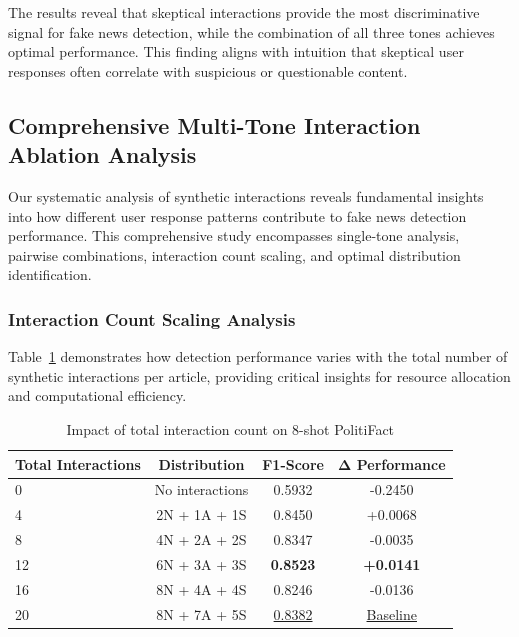 The results reveal that skeptical interactions provide the most discriminative signal for fake news detection, while the combination of all three tones achieves optimal performance. This finding aligns with intuition that skeptical user responses often correlate with suspicious or questionable content.

\subsection{Comprehensive Multi-Tone Interaction Ablation Analysis}

Our systematic analysis of synthetic interactions reveals fundamental insights into how different user response patterns contribute to fake news detection performance. This comprehensive study encompasses single-tone analysis, pairwise combinations, interaction count scaling, and optimal distribution identification.

\subsubsection{Interaction Count Scaling Analysis}

Table~\ref{tab:interaction_count_scaling} demonstrates how detection performance varies with the total number of synthetic interactions per article, providing critical insights for resource allocation and computational efficiency.

\begin{table}[htbp]
\centering
\caption{Impact of total interaction count on 8-shot PolitiFact}
\label{tab:interaction_count_scaling}
\begin{tabular}{lccc}
\toprule
\textbf{Total Interactions} & \textbf{Distribution} & \textbf{F1-Score} & \textbf{Δ Performance} \\
\midrule
0 & No interactions & 0.5932 & -0.2450 \\
4 & 2N + 1A + 1S & 0.8450 & +0.0068 \\
8 & 4N + 2A + 2S & 0.8347 & -0.0035 \\
12 & 6N + 3A + 3S & \textbf{0.8523} & \textbf{+0.0141} \\
16 & 8N + 4A + 4S & 0.8246 & -0.0136 \\
20 & 8N + 7A + 5S & \underline{0.8382} & \underline{Baseline} \\
\bottomrule
\end{tabular}
\end{table}

